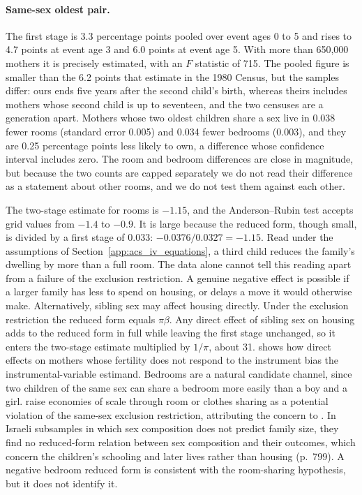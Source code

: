 \paragraph{Same-sex oldest pair.}
The first stage is 3.3 percentage points pooled over event ages 0 to 5 and rises to
4.7 points at event age 3 and 6.0 points at event age 5. With more than 650,000
mothers it is precisely estimated, with an $F$ statistic of 715. The pooled figure
is smaller than the 6.2 points that \citet[p.~461]{angrist1998children} estimate in
the 1980 Census, but the samples differ: ours ends five years after the second
child's birth, whereas theirs includes mothers whose second child is up to
seventeen, and the two censuses are a generation apart. Mothers whose two oldest
children share a sex live in 0.038 fewer rooms (standard error 0.005) and 0.034
fewer bedrooms (0.003), and they are 0.25 percentage points less likely to own, a
difference whose confidence interval includes zero. The room and bedroom
differences are close in magnitude, but because the two counts are capped
separately we do not read their difference as a statement about other rooms, and we
do not test them against each other.

The two-stage estimate for rooms is $-1.15$, and the Anderson--Rubin test accepts
grid values from $-1.4$ to $-0.9$. It is large because the reduced form, though
small, is divided by a first stage of 0.033: $-0.0376/0.0327=-1.15$. Read under the
assumptions of Section~\ref{app:acs_iv_equations}, a third child reduces the family's
dwelling by more than a full room. The data alone cannot tell this reading apart
from a failure of the exclusion restriction. A genuine negative effect is possible
if a larger family has less to spend on housing, or delays a move it would otherwise
make. Alternatively, sibling sex may affect housing directly. Under the exclusion
restriction the reduced form equals $\pi\beta$. Any direct effect of sibling sex on
housing adds to the reduced form in full while leaving the first stage unchanged,
so it enters the two-stage estimate multiplied by $1/\pi$, about 31.
\citet{jones2015exclusion} shows how direct effects on mothers whose fertility does
not respond to the instrument bias the instrumental-variable estimand. Bedrooms are
a natural candidate channel, since two children of the same sex can share a bedroom
more easily than a boy and a girl. \citet[p.~775]{angrist2010multiple} raise
economies of scale through room or clothes sharing as a potential violation of the
same-sex exclusion restriction, attributing the concern to
\citet{rosenzweig2000natural}. In Israeli subsamples in which sex composition does
not predict family size, they find no reduced-form relation between sex composition
and their outcomes, which concern the children's schooling and later lives rather
than housing (p.~799). A negative bedroom reduced form is consistent with the
room-sharing hypothesis, but it does not identify it.

